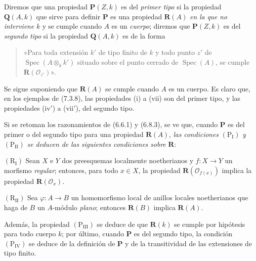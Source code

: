
\begin{env}[7.3.10]
\label{IV.2.s7.3.10-fr}
Diremos que una propiedad $\boldsymbol P(Z,k)$ es del \emph{primer
tipo} si la propiedad $\boldsymbol Q(A,k)$ que sirve para definir
$\boldsymbol P$ es una propiedad $\boldsymbol R(A)$ \emph{en la que no
interviene $k$} y se cumple cuando $A$ es un \emph{cuerpo}; diremos que
$\boldsymbol P(Z,k)$ es del \emph{segundo tipo} si la propiedad
$\boldsymbol Q(A,k)$ es de la forma
\begin{quote}
«Para toda extensión $k'$ de tipo finito de $k$ y todo punto $z'$ de
$\operatorname{Spec}(A\otimes_k k')$ situado sobre el punto cerrado de
$\operatorname{Spec}(A)$, se cumple $\boldsymbol R(\mathscr O_{z'})$».
\end{quote}
Se sigue suponiendo que $\boldsymbol R(A)$ se cumple cuando $A$ es un
cuerpo. Es claro que, en los ejemplos de (7.3.8), las propiedades (i)
a (vii) son del primer tipo, y las propiedades (iv$'$) a (vii$'$), del
segundo tipo.

Si se retoman los razonamientos de (6.6.1) y (6.8.3), se ve que, cuando
$\boldsymbol P$ es del primer o del segundo tipo para una propiedad
$\boldsymbol R(A)$, \emph{las condiciones $(\mathrm P_{\mathrm I})$ y
$(\mathrm P_{\mathrm{II}})$ se deducen de las siguientes condiciones
sobre $\boldsymbol R$}:

$(\mathrm R_{\mathrm I})$ Sean $X$ e $Y$ dos preesquemas localmente
noetherianos y $f:X\to Y$ un morfismo \emph{regular}; entonces, para
todo $x\in X$, la propiedad $\boldsymbol R(\mathscr O_{f(x)})$ implica
la propiedad $\boldsymbol R(\mathscr O_x)$.

$(\mathrm R_{\mathrm{II}})$ Sea $\varphi:A\to B$ un homomorfismo local
de anillos locales noetherianos que haga de $B$ un $A$-módulo \emph{plano};
entonces $\boldsymbol R(B)$ implica $\boldsymbol R(A)$.

Además, la propiedad $(\mathrm P_{\mathrm{III}})$ se deduce de que
$\boldsymbol R(k)$ se cumple por hipótesis para todo cuerpo $k$; por
último, cuando $\boldsymbol P$ es del segundo tipo, la condición
$(\mathrm P_{\mathrm{IV}})$ se deduce de la definición de $\boldsymbol P$
y de la transitividad de las extensiones de tipo finito.
\end{env}
